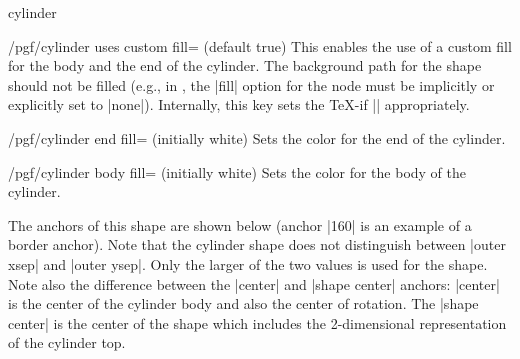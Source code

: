 \begin{shape}{cylinder}
    \begin{key}{/pgf/cylinder uses custom fill= (default true)}
      This enables the use of a custom fill for the body and the end of the
      cylinder. The background path for the shape should not be filled (e.g.,
      in \tikzname{}, the |fill| option for the node must be implicitly or
      explicitly set to |none|). Internally, this key sets the \TeX-if
      |\ifpgfcylinderusescustomfill| appropriately.
    \end{key}
\begin{codeexample}[preamble={\usetikzlibrary{shapes.geometric}}]
\end{codeexample}

    \begin{key}{/pgf/cylinder end fill= (initially white)}
        Sets the color for the end of the cylinder.
    \end{key}

    \begin{key}{/pgf/cylinder body fill= (initially white)}
        Sets the color for the body of the cylinder.
    \end{key}

    The anchors of this shape are shown below (anchor |160| is an example of a
    border anchor). Note that the cylinder shape does not distinguish between
    |outer xsep| and |outer ysep|. Only the larger of the two values is used
    for the shape. Note also the difference between the |center| and
    |shape center| anchors: |center| is the center of the cylinder body and
    also the center of rotation. The |shape center| is the center of the shape
    which includes the 2-dimensional representation of the cylinder top.
\begin{codeexample}[preamble={\usetikzlibrary{shapes.geometric}}]
\Huge
{}
\end{codeexample}
\end{shape}


